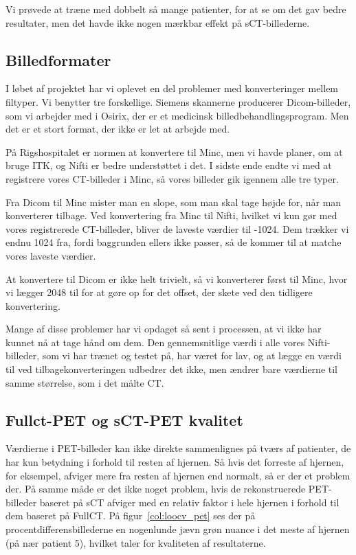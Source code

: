 Vi prøvede at træne med dobbelt så mange patienter, for at se om det gav bedre resultater, men det havde ikke nogen mærkbar effekt på sCT-billederne.


\subsection{Billedformater}

I løbet af projektet har vi oplevet en del problemer med konverteringer
mellem filtyper. Vi benytter tre forskellige. Siemens skannerne producerer
Dicom-billeder, som vi arbejder med i Osirix, der er et medicinsk
billedbehandlingsprogram. Men det er et stort format, der ikke er
let at arbejde med. 

På Rigshospitalet er normen at konvertere til Minc, men vi havde planer,
om at bruge ITK, og Nifti er bedre understøttet i det. I sidste ende
endte vi med at registrere vores CT-billeder i Minc, så vores billeder gik
igennem alle tre typer. 

Fra Dicom til Minc mister man en slope, som man skal tage højde for, når
man konverterer tilbage. Ved konvertering fra Minc til Nifti, hvilket vi
kun gør med vores registrerede CT-billeder, bliver de laveste værdier til
-1024. Dem trækker vi endnu 1024 fra, fordi baggrunden ellers ikke passer, så de kommer til at matche vores
laveste værdier.

At konvertere til Dicom er ikke helt trivielt, så vi konverterer først til
Minc, hvor vi lægger 2048 til for at gøre op for det offset, der skete ved
den tidligere konvertering. 

Mange af disse problemer har vi opdaget så sent i processen, at vi ikke
har kunnet nå at tage hånd om dem. Den gennemsnitlige værdi i alle vores
Nifti-billeder, som vi har trænet og testet på, har været for lav, og at
lægge en værdi til ved tilbagekonverteringen udbedrer det ikke, men ændrer
bare værdierne til samme størrelse, som i det målte CT.

\subsection{Fullct-PET og sCT-PET kvalitet}

Værdierne i PET-billeder kan ikke direkte sammenlignes på tværs af patienter, de har kun betydning i forhold til resten af hjernen. Så hvis det forreste af hjernen, for eksempel, afviger mere fra resten af hjernen end normalt, så er der et problem der. På samme måde er det ikke noget problem, hvis de rekonstruerede PET-billeder baseret på sCT afviger med en relativ faktor i hele hjernen i forhold til dem baseret på FullCT. På figur~\ref{col:loocv_pet} ses der på procentdifferensbillederne en nogenlunde jævn grøn nuance i det meste af hjernen (på nær patient 5), hvilket taler for kvaliteten af resultaterne. 


